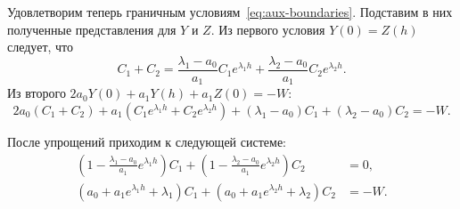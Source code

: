 \documentclass[a4paper,14pt]{article}
\begin{document}
Удовлетворим теперь граничным условиям~\eqref{eq:aux-boundaries}.
Подставим в них полученные представления для $Y$ и $Z$. Из
первого условия $Y(0) = Z(h)$ следует, что
\begin{equation*}
  C_1 + C_2 =
  \frac{\lambda_1 - a_0}{a_1} C_1 e^{\lambda_1 h}
  +
  \frac{\lambda_2 - a_0}{a_1} C_2 e^{\lambda_2 h}.
\end{equation*}
Из второго $2 a_0 Y(0) + a_1 Y(h) + a_1 Z(0) = -W$:
\begin{equation*}
  2 a_0 (C_1 + C_2) + a_1 \left(
    C_1 e^{\lambda_1 h} + C_2 e^{\lambda_2 h}
  \right)
  +
  (\lambda_1 - a_0) C_1 + (\lambda_2 - a_0) C_2 = -W.
\end{equation*}

После упрощений приходим к следующей системе:
\begin{equation}
  \begin{aligned}
    \left( 1 - \frac{\lambda_1 - a_0}{a_1} e^{\lambda_1 h} \right) C_1
    +
    \left( 1 - \frac{\lambda_2 - a_0}{a_1} e^{\lambda_2 h} \right) C_2 &= 0, \\
    \left(
    a_0 + a_1 e^{\lambda_1 h} + \lambda_1
    \right) C_1
    +
    \left(
    a_0 + a_1 e^{\lambda_2 h} + \lambda_2
    \right) C_2
    &= -W.
  \end{aligned}
\end{equation}
\end{document}
